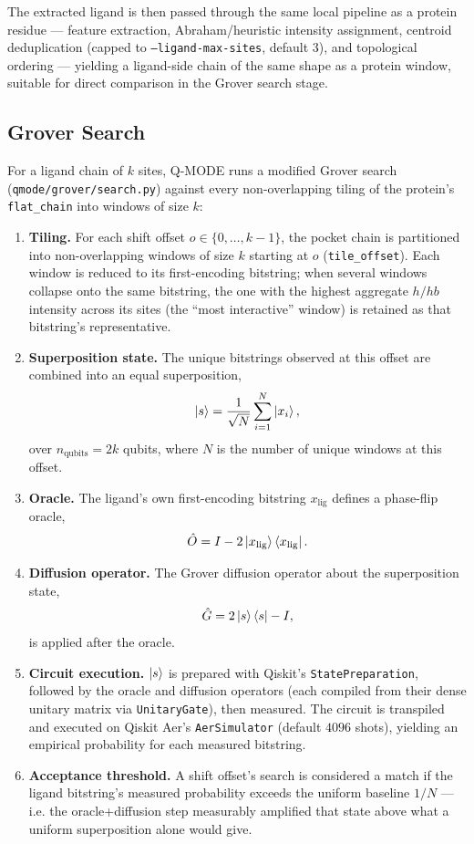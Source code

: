 \documentclass[11pt,a4paper]{article}
\begin{document}
The extracted ligand is then passed through the same local pipeline as a protein residue — feature extraction, Abraham/heuristic intensity assignment, centroid deduplication (capped to \texttt{--ligand-max-sites}, default 3), and topological ordering — yielding a ligand-side chain of the same shape as a protein window, suitable for direct comparison in the Grover search stage.

\subsection{Grover Search}
\label{sec:grover-search}

For a ligand chain of $k$ sites, Q-MODE runs a modified Grover search (\texttt{qmode/grover/search.py}) against every non-overlapping tiling of the protein's \texttt{flat\_chain} into windows of size $k$:

\begin{enumerate}[leftmargin=1.8em]
    \item \textbf{Tiling.} For each shift offset $o \in \{0, \ldots, k-1\}$, the pocket chain is partitioned into non-overlapping windows of size $k$ starting at $o$ (\texttt{tile\_offset}). Each window is reduced to its first-encoding bitstring; when several windows collapse onto the same bitstring, the one with the highest aggregate $h/hb$ intensity across its sites (the ``most interactive'' window) is retained as that bitstring's representative.
    \item \textbf{Superposition state.} The unique bitstrings observed at this offset are combined into an equal superposition,
    \[
    \ket{s} = \frac{1}{\sqrt{N}} \sum_{i=1}^{N} \ket{x_i},
    \]
    over $n_{\text{qubits}} = 2k$ qubits, where $N$ is the number of unique windows at this offset.
    \item \textbf{Oracle.} The ligand's own first-encoding bitstring $x_{\text{lig}}$ defines a phase-flip oracle,
    \[
    \hat{O} = I - 2\ket{x_{\text{lig}}}\bra{x_{\text{lig}}}.
    \]
    \item \textbf{Diffusion operator.} The Grover diffusion operator about the superposition state,
    \[
    \hat{G} = 2\ket{s}\bra{s} - I,
    \]
    is applied after the oracle.
    \item \textbf{Circuit execution.} $\ket{s}$ is prepared with Qiskit's \texttt{StatePreparation}, followed by the oracle and diffusion operators (each compiled from their dense unitary matrix via \texttt{UnitaryGate}), then measured. The circuit is transpiled and executed on Qiskit Aer's \texttt{AerSimulator} (default $4096$ shots), yielding an empirical probability for each measured bitstring.
    \item \textbf{Acceptance threshold.} A shift offset's search is considered a match if the ligand bitstring's measured probability exceeds the uniform baseline $1/N$ — i.e. the oracle+diffusion step measurably amplified that state above what a uniform superposition alone would give.
\end{enumerate}
\end{document}
